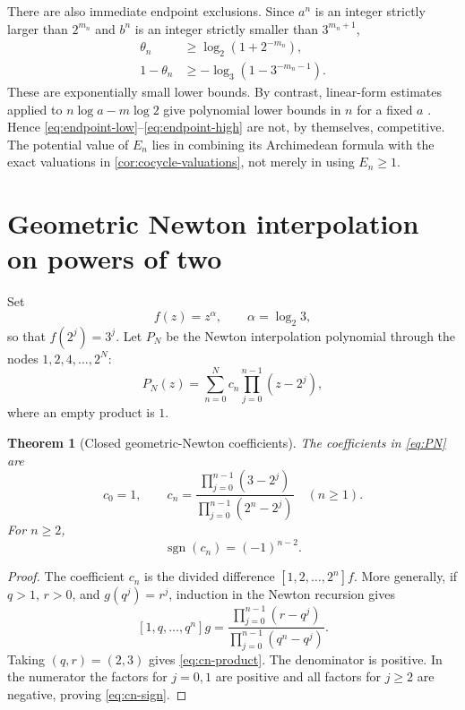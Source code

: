 \documentclass[11pt]{article}
\newtheorem{theorem}{Theorem}[section]
\theoremstyle{definition}
\begin{document}
There are also immediate endpoint exclusions.  Since $a^n$ is an integer strictly larger than $2^{m_n}$ and $b^n$ is an integer strictly smaller than $3^{m_n+1}$,
\begin{align}
 \theta_n&\ge \log_2(1+2^{-m_n}),\label{eq:endpoint-low}\\
 1-\theta_n&\ge-\log_3(1-3^{-m_n-1}).\label{eq:endpoint-high}
\end{align}
These are exponentially small lower bounds.  By contrast, linear-form estimates applied to $n\log a-m\log2$ give polynomial lower bounds in $n$ for a fixed $a$ \cite{BakerWustholz1993,Matveev2000}.  Hence \eqref{eq:endpoint-low}--\eqref{eq:endpoint-high} are not, by themselves, competitive.  The potential value of $E_n$ lies in combining its Archimedean formula with the exact valuations in \cref{cor:cocycle-valuations}, not merely in using $E_n\ge1$.

\section{Geometric Newton interpolation on powers of two}\label{sec:qnewton}

Set
\[
 f(z)=z^\alpha,\qquad \alpha=\log_2 3,
\]
so that $f(2^j)=3^j$.  Let $P_N$ be the Newton interpolation polynomial through the nodes $1,2,4,\dots,2^N$:
\begin{equation}\label{eq:PN}
 P_N(z)=\sum_{n=0}^N c_n\prod_{j=0}^{n-1}(z-2^j),
\end{equation}
where an empty product is $1$.

\begin{theorem}[Closed geometric-Newton coefficients]\label{thm:qnewton-coeff}
The coefficients in \eqref{eq:PN} are
\begin{equation}\label{eq:cn-product}
 c_0=1,\qquad
 c_n=\frac{\displaystyle\prod_{j=0}^{n-1}(3-2^j)}
 {\displaystyle\prod_{j=0}^{n-1}(2^n-2^j)}\quad(n\ge1).
\end{equation}
For $n\ge2$,
\begin{equation}\label{eq:cn-sign}
 \operatorname{sgn}(c_n)=(-1)^{n-2}.
\end{equation}
\end{theorem}
\begin{proof}
The coefficient $c_n$ is the divided difference $[1,2,\dots,2^n]f$.  More generally, if $q>1$, $r>0$, and $g(q^j)=r^j$, induction in the Newton recursion gives
\[
 [1,q,\dots,q^n]g=\frac{\prod_{j=0}^{n-1}(r-q^j)}{\prod_{j=0}^{n-1}(q^n-q^j)}.
\]
Taking $(q,r)=(2,3)$ gives \eqref{eq:cn-product}.  The denominator is positive.  In the numerator the factors for $j=0,1$ are positive and all factors for $j\ge2$ are negative, proving \eqref{eq:cn-sign}.
\end{proof}
\end{document}
